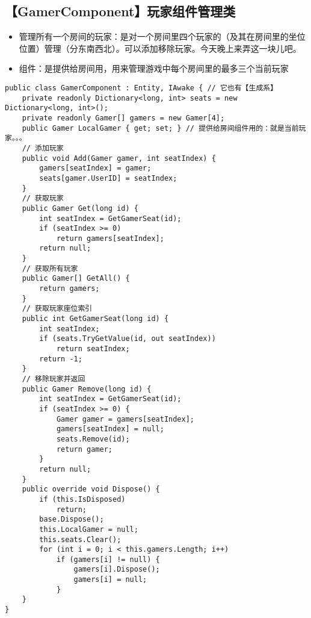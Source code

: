 \documentclass[9pt, b5paper]{article}
\begin{document}
\subsection{【GamerComponent】玩家组件管理类}
\label{sec-3-1}
\begin{itemize}
\item 管理所有一个房间的玩家：是对一个房间里四个玩家的（及其在房间里的坐位位置）管理（分东南西北）。可以添加移除玩家。今天晚上来弄这一块儿吧。
\item 组件：是提供给房间用，用来管理游戏中每个房间里的最多三个当前玩家
\end{itemize}
\begin{verbatim}
public class GamerComponent : Entity, IAwake { // 它也有【生成系】
    private readonly Dictionary<long, int> seats = new Dictionary<long, int>();
    private readonly Gamer[] gamers = new Gamer[4]; 
    public Gamer LocalGamer { get; set; } // 提供给房间组件用的：就是当前玩家。。。
    // 添加玩家
    public void Add(Gamer gamer, int seatIndex) {
        gamers[seatIndex] = gamer;
        seats[gamer.UserID] = seatIndex;
    }
    // 获取玩家
    public Gamer Get(long id) {
        int seatIndex = GetGamerSeat(id);
        if (seatIndex >= 0) 
            return gamers[seatIndex];
        return null;
    }
    // 获取所有玩家
    public Gamer[] GetAll() {
        return gamers;
    }
    // 获取玩家座位索引
    public int GetGamerSeat(long id) {
        int seatIndex;
        if (seats.TryGetValue(id, out seatIndex)) 
            return seatIndex;
        return -1;
    }
    // 移除玩家并返回
    public Gamer Remove(long id) {
        int seatIndex = GetGamerSeat(id);
        if (seatIndex >= 0) {
            Gamer gamer = gamers[seatIndex];
            gamers[seatIndex] = null;
            seats.Remove(id);
            return gamer;
        }
        return null;
    }
    public override void Dispose() {
        if (this.IsDisposed) 
            return;
        base.Dispose();
        this.LocalGamer = null;
        this.seats.Clear();
        for (int i = 0; i < this.gamers.Length; i++) 
            if (gamers[i] != null) {
                gamers[i].Dispose();
                gamers[i] = null;
            }
    }
}
\end{verbatim}
\end{document}
